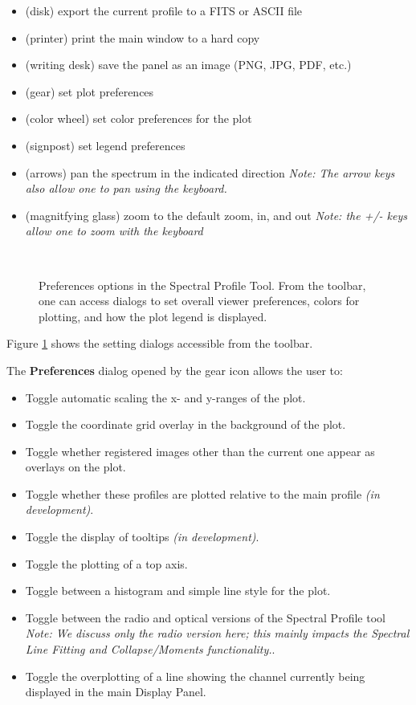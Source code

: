 \begin{itemize}
\item (disk) export the current profile to a FITS or ASCII file
\item (printer) print the main window to a hard copy
\item (writing desk) save the panel as an image (PNG, JPG, PDF, etc.)
\item (gear) set plot preferences
\item (color wheel) set color preferences for the plot
\item (signpost) set legend preferences
\item (arrows) pan the spectrum in the indicated direction
{\em Note: The arrow keys also allow one to pan using the keyboard.}
\item (magnitfying glass) zoom to the default zoom, in, and out
{\em Note: the +/- keys allow one to zoom with the keyboard}
\end{itemize}


\begin{figure}[h!]
\begin{center}
\hrulefill \\
\caption{\label{fig:viewer_prefs} Preferences options in the Spectral Profile Tool. From the toolbar, one
can access dialogs to set overall viewer preferences, colors for plotting, and how the plot legend is displayed.}
\hrulefill
\end{center}
\end{figure}

Figure \ref{fig:viewer_prefs} shows the setting dialogs accessible from the toolbar. 

The {\bf Preferences} dialog opened by the gear icon allows the user to:

\begin{itemize}
\item Toggle automatic scaling the x- and y-ranges of the plot. 
\item Toggle the coordinate grid overlay in the background of the plot.
\item Toggle whether registered images other than the current one appear as overlays on the plot.
\item Toggle whether these profiles are plotted relative to the main profile {\em (in development)}.
\item Toggle the display of tooltips {\em (in development)}.
\item Toggle the plotting of a top axis.
\item Toggle between a histogram and simple line style for the plot.
\item Toggle between the radio and optical versions of the Spectral Profile tool {\em Note: We discuss only the radio version here; this mainly
impacts the Spectral Line Fitting and Collapse/Moments functionality.}.
\item Toggle the overplotting of a line showing the channel currently being displayed in the main Display Panel.
\end{itemize}

